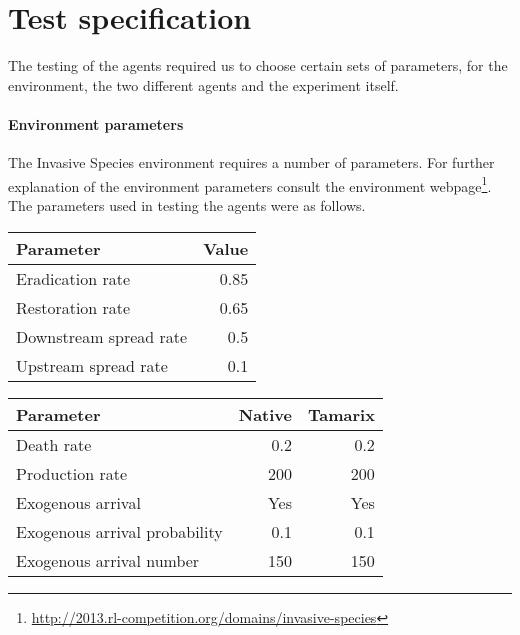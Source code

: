 \section{Test specification}
\label{sec:test_spec}

The testing of the agents required us to choose certain sets of parameters, for
the environment, the two different agents and the experiment itself. 

\paragraph{Environment parameters}

The Invasive Species environment requires a number of parameters. For further
explanation of the environment parameters consult the environment
webpage\footnote{\url{http://2013.rl-competition.org/domains/invasive-species}}.
The parameters used in testing the agents were as follows.

\begin{table}[H]
\centering
{}
\label{tab:dynamic_params_common} 
\begin{tabular}{l r}
 \toprule
 Parameter & Value \\
 \midrule
 Eradication rate & 0.85 \\
 Restoration rate & 0.65 \\
 Downstream spread rate & 0.5 \\
 Upstream spread rate & 0.1 \\
 \bottomrule
\end{tabular}
\end{table}

\begin{table}[H]
\centering
{} \label{tab:dynamic_params_not_common}
\begin{tabular}{lrr}
\toprule
 Parameter & Native & Tamarix \\
 \midrule
 Death rate & 0.2 & 0.2 \\
 Production rate & 200 & 200 \\
 Exogenous arrival & Yes & Yes \\
 Exogenous arrival probability & 0.1 & 0.1 \\
 Exogenous arrival number & 150 & 150 \\
 \bottomrule
\end{tabular}
\end{table}

